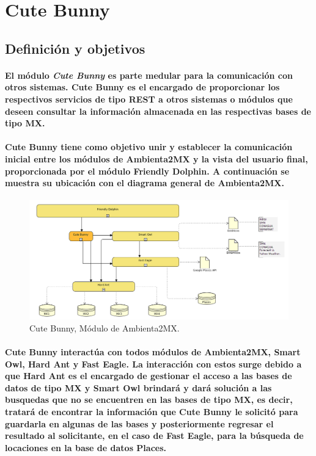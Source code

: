 \section{Cute Bunny}
  \subsection{Definición y objetivos}
    \paragraph{El módulo \textbf{\emph{Cute Bunny}} es parte medular para la comunicación con otros sistemas. Cute Bunny es el encargado de proporcionar los respectivos servicios de tipo REST a otros sistemas o módulos que deseen consultar la información almacenada en las respectivas bases de tipo MX.}
    \paragraph{Cute Bunny tiene como objetivo unir y establecer la comunicación inicial entre los módulos de Ambienta2MX y la vista del usuario final, proporcionada por el módulo Friendly Dolphin. A continuación se muestra su ubicación con el diagrama general de Ambienta2MX.}
    \begin{figure}[h!]
        \centering
          \includegraphics[width=\textwidth]{./images/DiagramaAmbienta2MX_CuteBunny.png}
        \caption{Cute Bunny, Módulo de Ambienta2MX.}
    \end{figure}
    \paragraph{Cute Bunny interactúa con todos módulos de Ambienta2MX, Smart Owl, Hard Ant y Fast Eagle. La interacción con estos surge debido a que Hard Ant es el encargado de gestionar el acceso a las bases de datos de tipo MX y Smart Owl brindará y dará solución a las busquedas que no se encuentren en las bases de tipo MX, es decir, tratará de encontrar la información que Cute Bunny le solicitó para guardarla en algunas de las bases y posteriormente regresar el resultado al solicitante, en el caso de Fast Eagle, para la búsqueda de locaciones en la base de datos Places.}
